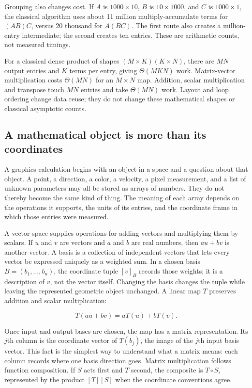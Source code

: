 Grouping also changes cost. If \(A\) is \(1000\times10\), \(B\) is \(10\times1000\), and \(C\) is \(1000\times1\), the classical algorithm uses about 11 million multiply-accumulate terms for \((AB)C\), versus 20 thousand for \(A(BC)\). The first route also creates a million-entry intermediate; the second creates ten entries. These are arithmetic counts, not measured timings.

For a classical dense product of shapes \((M\times K)(K\times N)\), there are \(MN\) output entries and \(K\) terms per entry, giving \(\Theta(MKN)\) work. Matrix-vector multiplication costs \(\Theta(MN)\) for an \(M\times N\) map. Addition, scalar multiplication and transpose touch \(MN\) entries and take \(\Theta(MN)\) work. Layout and loop ordering change data reuse; they do not change these mathematical shapes or classical asymptotic counts.

\subsection{A mathematical object is more than its coordinates}\label{01-foundations-i-ch018-a-mathematical-object-is-more-than-its-coordinates}

\hypertarget{01-foundations-i-ch018-a-mathematical-object-is-more-than-its-coordinates}{}

A graphics calculation begins with an object in a space and a question about that object. A point, a direction, a color, a velocity, a pixel measurement, and a list of unknown parameters may all be stored as arrays of numbers. They do not thereby become the same kind of thing. The meaning of each array depends on the operations it supports, the units of its entries, and the coordinate frame in which those entries were measured.

A vector space supplies operations for adding vectors and multiplying them by scalars. If \(u\) and \(v\) are vectors and \(a\) and \(b\) are real numbers, then \(au+bv\) is another vector. A basis is a collection of independent vectors that lets every vector be expressed uniquely as a weighted sum. In a chosen basis \(B=(b_1,\ldots,b_n)\), the coordinate tuple \([v]_B\) records those weights; it is a description of \(v\), not the vector itself. Changing the basis changes the tuple while leaving the represented geometric object unchanged. A linear map \(T\) preserves addition and scalar multiplication:

\[
T(au+bv)=aT(u)+bT(v).
\]

Once input and output bases are chosen, the map has a matrix representation. Its \(j\)th column is the coordinate vector of \(T(b_j)\), the image of the \(j\)th input basis vector. This fact is the simplest way to understand what a matrix means: each column records where one basis direction goes. Matrix multiplication follows function composition. If \(S\) acts first and \(T\) second, the composite is \(T\circ S\), represented by the product \([T][S]\) when the coordinate conventions agree.

